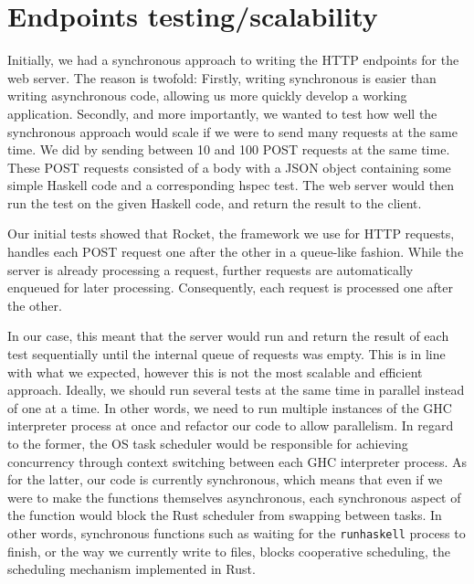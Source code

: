 \section{Endpoints testing/scalability}
Initially, we had a synchronous approach to writing the HTTP endpoints for the web server.
The reason is twofold: Firstly, writing synchronous is easier than writing asynchronous code, allowing us more quickly develop a working application. 
Secondly, and more importantly, we wanted to test how well the synchronous approach would scale if we were to send many requests at the same time.
We did by sending between 10 and 100 POST requests at the same time.
These POST requests consisted of a body with a JSON object containing some simple Haskell code and a corresponding hspec test.
The web server would then run the test on the given Haskell code, and return the result to the client.


Our initial tests showed that Rocket, the framework we use for HTTP requests, handles each POST request one after the other in a queue-like fashion.
While the server is already processing a request, further requests are automatically enqueued for later processing.
Consequently, each request is processed one after the other.


In our case, this meant that the server would run and return the result of each test sequentially until the internal queue of requests was empty.
This is in line with what we expected, however this is not the most scalable and efficient approach.
Ideally, we should run several tests at the same time in parallel instead of one at a time.
In other words, we need to run multiple instances of the GHC interpreter process at once and refactor our code to allow parallelism.
In regard to the former, the OS task scheduler would be responsible for achieving concurrency through context switching between each GHC interpreter process.
As for the latter, our code is currently synchronous, which means that even if we were to make the functions themselves asynchronous, each synchronous aspect of the function would block the Rust scheduler from swapping between tasks.
In other words, synchronous functions such as waiting for the \texttt{runhaskell} process to finish, or the way we currently write to files, blocks cooperative scheduling, the scheduling mechanism implemented in Rust.
